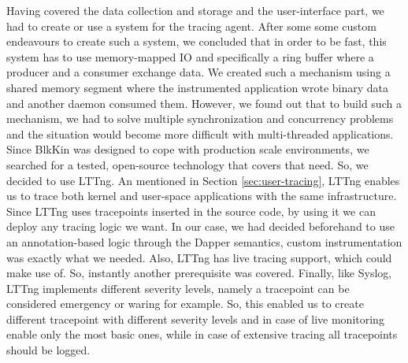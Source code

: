 Having covered the data collection and storage and the user-interface part, we
had to create or use a system for the tracing agent. After some some custom
endeavours to create such a system, we concluded that in order to be fast, this
system has to use memory-mapped IO and specifically a ring buffer where a
producer and a consumer exchange data. We created such a mechanism using a
shared memory segment where the instrumented application wrote binary data and
another daemon consumed them. However, we found out that to build such a
mechanism, we had to solve multiple synchronization and concurrency problems and
the situation would become more difficult with multi-threaded applications.
Since BlkKin was designed to cope with production scale environments, we
searched for a tested, open-source technology that covers that need. So, we
decided to use LTTng. An mentioned in Section \ref{sec:user-tracing}, LTTng
enables us to trace both kernel and user-space applications with the same
infrastructure. Since LTTng uses tracepoints inserted in the source code, by
using it we can deploy any tracing logic we want. In our case, we had decided
beforehand to use an annotation-based logic through the Dapper semantics, custom
instrumentation was exactly what we needed. Also, LTTng has live tracing
support, which could make use of. So, instantly another prerequisite was
covered. Finally, like Syslog, LTTng implements different severity levels,
namely a tracepoint can be considered emergency or waring for example. So, this
enabled us to create different tracepoint with different severity levels and in
case of live monitoring enable only the most basic ones, while in case of
extensive tracing all tracepoints should be logged.

